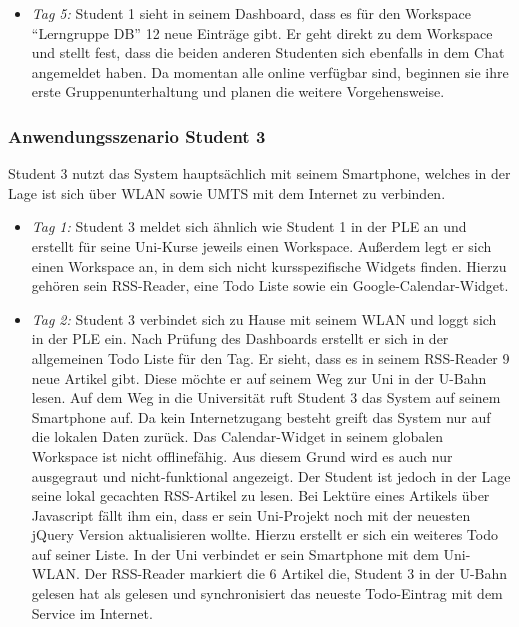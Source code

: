 \begin{itemize}
 \item \emph{Tag 5:} Student 1 sieht in seinem Dashboard, dass es für den Workspace “Lerngruppe DB” 12 neue Einträge gibt. Er geht direkt zu dem Workspace und stellt fest, dass die beiden anderen Studenten sich ebenfalls in dem Chat angemeldet haben. Da momentan alle online verfügbar sind, beginnen sie ihre erste Gruppenunterhaltung und planen die weitere Vorgehensweise.
\end{itemize}

\subsubsection*{Anwendungsszenario Student 3}
Student 3 nutzt das System hauptsächlich mit seinem Smartphone, welches in der Lage ist sich über WLAN sowie UMTS mit dem Internet zu verbinden.

\begin{itemize}
 \item \emph{Tag 1:} Student 3 meldet sich ähnlich wie Student 1 in der PLE an und erstellt für seine Uni-Kurse jeweils einen Workspace. Außerdem legt er sich einen Workspace an, in dem sich nicht kursspezifische Widgets finden. Hierzu gehören sein RSS-Reader, eine Todo Liste sowie ein Google-Calendar-Widget.
 \item \emph{Tag 2:} Student 3 verbindet sich zu Hause mit seinem WLAN und loggt sich in der PLE ein. Nach Prüfung des Dashboards erstellt er sich in der allgemeinen Todo Liste für den Tag. Er sieht, dass es in seinem RSS-Reader 9 neue Artikel gibt. Diese möchte er auf seinem Weg zur Uni in der U-Bahn lesen. Auf dem Weg in die Universität ruft Student 3 das System auf seinem Smartphone auf. Da kein Internetzugang besteht greift das System nur auf die lokalen Daten zurück. Das Calendar-Widget in seinem globalen Workspace ist nicht offlinefähig. Aus diesem Grund wird es auch nur ausgegraut und nicht-funktional angezeigt. Der Student ist jedoch in der Lage seine lokal gecachten RSS-Artikel zu lesen. Bei Lektüre eines Artikels über Javascript fällt ihm ein, dass er sein Uni-Projekt noch mit der neuesten jQuery Version aktualisieren wollte. Hierzu erstellt er sich ein weiteres Todo auf seiner Liste.
 In der Uni verbindet er sein Smartphone mit dem Uni-WLAN. Der RSS-Reader markiert die 6 Artikel die, Student 3 in der U-Bahn gelesen hat als gelesen und synchronisiert das neueste Todo-Eintrag mit dem Service im Internet.  
\end{itemize}

